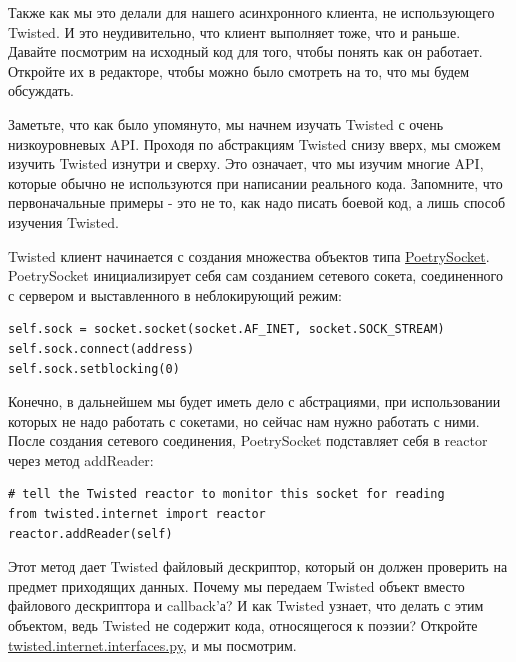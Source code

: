 Также как мы это делали для нашего асинхронного клиента, 
не использующего Twisted. И это неудивительно, что клиент 
выполняет тоже, что и раньше. Давайте посмотрим на исходный код 
для того, чтобы понять как он работает. Откройте их в редакторе, чтобы можно было 
смотреть на то, что мы будем обсуждать.


Заметьте, что как было упомянуто, мы начнем изучать Twisted с 
очень низкоуровневых API. Проходя по абстракциям Twisted снизу 
вверх, мы сможем изучить Twisted изнутри и сверху. Это означает, что 
мы изучим многие API, которые обычно не используются при 
написании реального кода. Запомните, что первоначальные примеры - это не 
то, как надо писать боевой код, а лишь способ изучения Twisted.


Twisted клиент начинается с создания множества объектов типа 
\href{http://github.com/jdavisp3/twisted-intro/blob/master/twisted-client-1/get-poetry.py#L53}{PoetrySocket}. 
PoetrySocket инициализирует себя сам созданием сетевого 
сокета, соединенного с сервером и выставленного в неблокирующий режим: 

\begin{scriptsize}\begin{verbatim}
self.sock = socket.socket(socket.AF_INET, socket.SOCK_STREAM)
self.sock.connect(address)
self.sock.setblocking(0)
\end{verbatim}\end{scriptsize}


Конечно, в дальнейшем мы будет иметь дело с 
абстрациями, при использовании которых не надо 
работать с сокетами, но сейчас нам нужно работать с ними. 
После создания сетевого соединения, PoetrySocket подставляет 
себя в reactor через метод addReader:

\begin{scriptsize}\begin{verbatim}
# tell the Twisted reactor to monitor this socket for reading
from twisted.internet import reactor
reactor.addReader(self)
\end{verbatim}\end{scriptsize}

Этот метод дает Twisted файловый дескриптор, который он должен 
проверить на предмет приходящих данных. Почему мы передаем 
Twisted объект вместо файлового дескриптора и callback'а? 
И как Twisted узнает, что делать с этим объектом, ведь  
Twisted не содержит кода, относящегося к поэзии? Откройте 
\href{http://twistedmatrix.com/trac/browser/tags/releases/twisted-8.2.0/twisted/internet/interfaces.py}{twisted.internet.interfaces.py}, и мы посмотрим.


